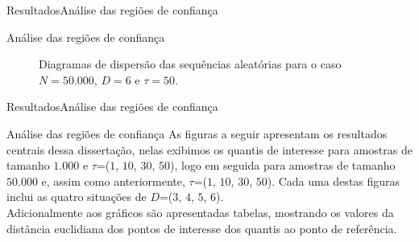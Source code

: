 \documentclass[10pt,xcolor={dvipsnames}]{beamer}
\begin{document}
\begin{frame}{Resultados}{Análise das regiões de confiança}
\begin{block}{Análise das regiões de confiança}
	\begin{figure}
		\centering
		\caption{Diagramas de dispersão das sequências aleatórias para o caso $N=50.000$, $D=6$ e $\tau=50$.}\label{Fig:QuantD3tau10log}
	\end{figure}
\end{block}
\end{frame}

\begin{frame}{Resultados}{Análise das regiões de confiança}
\begin{block}{Análise das regiões de confiança}
As figuras a seguir apresentam os resultados centrais dessa dissertação, nelas exibimos os quantis de interesse para amostras de tamanho $1.000$ e $\tau$=($1$, $10$, $30$, $50$), logo em seguida para amostras de tamanho $50.000$ e, assim como anteriormente, $\tau$=($1$, $10$, $30$, $50$).
Cada uma destas figuras inclui as quatro situações de $D$=($3$, $4$, $5$, $6$).\\
\pause
Adicionalmente aos gráficos são apresentadas tabelas, mostrando os valores da distância euclidiana dos pontos de interesse dos quantis ao ponto de referência.
\end{block}
\end{frame}
\end{document}
